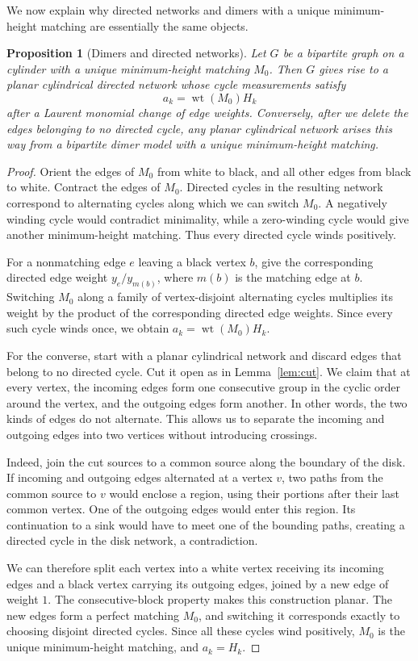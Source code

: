 \documentclass[11pt]{article}
\newtheorem{proposition}[theorem]{Proposition}
\theoremstyle{definition}
\theoremstyle{remark}
\newcommand{\wt}{\operatorname{wt}}
\begin{document}
We now explain why directed networks and dimers
with a unique minimum-height matching are essentially
the same objects.

\begin{proposition}[Dimers and directed networks]
\label{prop:unique-minimum}
Let $G$ be a bipartite graph on a cylinder with
a unique minimum-height matching $M_0$.
Then $G$ gives rise to a planar cylindrical
directed network whose cycle measurements satisfy
\[
a_k=\wt(M_0)H_k
\]
after a Laurent monomial change of edge weights.
Conversely, after we delete the edges belonging to no
directed cycle, any planar cylindrical network arises
this way from a bipartite dimer model with a unique
minimum-height matching.
\end{proposition}

\begin{proof}
Orient the edges of $M_0$ from white to black,
and all other edges from black to white.
Contract the edges of $M_0$. Directed cycles
in the resulting network correspond to
alternating cycles along which we can switch
$M_0$. A negatively winding cycle would
contradict minimality, while a zero-winding
cycle would give another minimum-height matching.
Thus every directed cycle winds positively.

For a nonmatching edge $e$ leaving a black
vertex $b$, give the corresponding directed
edge weight $y_e/y_{m(b)}$, where $m(b)$ is
the matching edge at $b$. Switching $M_0$
along a family of vertex-disjoint alternating
cycles multiplies its weight by the product
of the corresponding directed edge weights.
Since every such cycle winds once, we obtain
$a_k=\wt(M_0)H_k$.

For the converse, start with a planar cylindrical
network and discard edges that belong to no
directed cycle. Cut it open as in
Lemma~\ref{lem:cut}. 
We claim that at every vertex, the incoming
edges form one consecutive group in the cyclic
order around the vertex, and the outgoing edges
form another. In other words, the two kinds of
edges do not alternate. This allows us to
separate the incoming and outgoing edges into
two vertices without introducing crossings.

Indeed, join the cut sources to a common source
along the boundary of the disk. If incoming
and outgoing edges alternated at a vertex $v$,
two paths from the common source to $v$ would
enclose a region, using their portions after
their last common vertex. One of the outgoing
edges would enter this region. Its continuation
to a sink would have to meet one of the
bounding paths, creating a directed cycle
in the disk network, a contradiction.

We can therefore split each vertex into a
white vertex receiving its incoming edges
and a black vertex carrying its outgoing
edges, joined by a new edge of weight $1$.
The consecutive-block property makes this
construction planar. The new edges form a
perfect matching $M_0$, and switching it
corresponds exactly to choosing disjoint
directed cycles. Since all these cycles
wind positively, $M_0$ is the unique
minimum-height matching, and $a_k=H_k$.
\end{proof}
\end{document}
